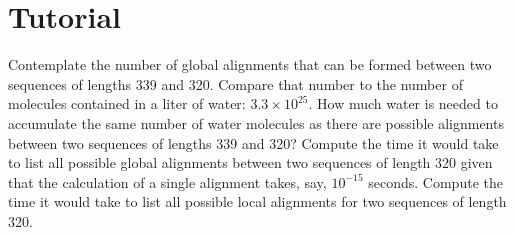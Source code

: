 \section{Tutorial}
\begin{itemize}
  \I Contemplate the number of global alignments that can be
  formed between two sequences of lengths 339 and 320.
  \I Compare that number to the number of molecules contained in a liter
  of water: $3.3 \times 10^{25}$. How much water is needed to
  accumulate the same number of water molecules as there are possible
  alignments between two sequences of lengths 339 and 320?
  \I Compute the time it would take to list all possible global
  alignments between two sequences of length 320 given that the
  calculation of a single alignment takes, say, $10^{-15}$ seconds.
  \I Compute the time it would take to list all possible local
  alignments for two sequences of length 320.
\end{itemize}





